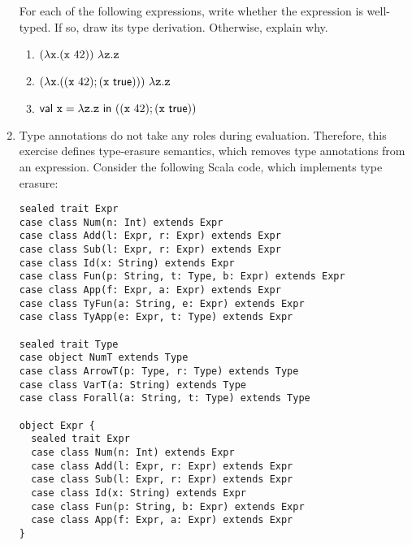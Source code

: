 \begin{enumerate}
For each of the following expressions, write whether the expression is
well-typed. If so, draw its type derivation. Otherwise, explain why.
\begin{enumerate}
  \item $(\lambda \code{x}.(\code{x}\ 42))\ \lambda \code{z}.\code{z}$
  \item $(\lambda \texttt{x}.((\texttt{x}\ 42); (\texttt{x}\ \textsf{true})))\ \lambda \texttt{z}.\texttt{z}$
  \item $\textsf{val}\ \code{x}=\lambda \code{z}.\code{z}\ \textsf{in}\ ((\code{x}\ 42); (\code{x}\ \textsf{true}))$
\end{enumerate}

\item Type annotations do not take any roles during evaluation.
Therefore, this exercise defines type-erasure semantics, which removes
type annotations from an expression.
Consider the following Scala code, which implements type erasure:
\begin{verbatim}
sealed trait Expr
case class Num(n: Int) extends Expr
case class Add(l: Expr, r: Expr) extends Expr
case class Sub(l: Expr, r: Expr) extends Expr
case class Id(x: String) extends Expr
case class Fun(p: String, t: Type, b: Expr) extends Expr
case class App(f: Expr, a: Expr) extends Expr
case class TyFun(a: String, e: Expr) extends Expr
case class TyApp(e: Expr, t: Type) extends Expr

sealed trait Type
case object NumT extends Type
case class ArrowT(p: Type, r: Type) extends Type
case class VarT(a: String) extends Type
case class Forall(a: String, t: Type) extends Type

object Expr {
  sealed trait Expr
  case class Num(n: Int) extends Expr
  case class Add(l: Expr, r: Expr) extends Expr
  case class Sub(l: Expr, r: Expr) extends Expr
  case class Id(x: String) extends Expr
  case class Fun(p: String, b: Expr) extends Expr
  case class App(f: Expr, a: Expr) extends Expr
}


\end{verbatim}
\end{enumerate}
